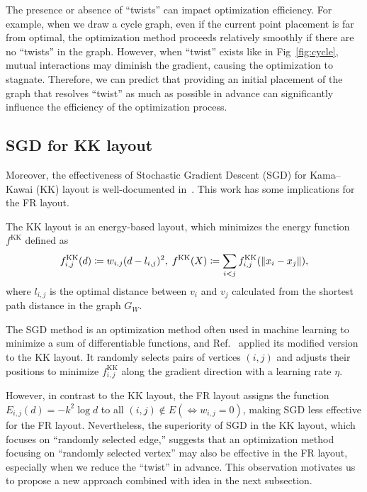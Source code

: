 \documentclass[dvipdfmx,10pt,journal,compsoc]{IEEEtran}
\newcommand{\defeq}{\coloneqq}
\begin{document}
The presence or absence of ``twists'' can impact optimization efficiency.
For example, when we draw a cycle graph, even if the current point placement is far from optimal, the optimization method proceeds relatively smoothly if there are no ``twists'' in the graph.
However, when ``twist'' exists like in Fig~\ref{fig:cycle}, mutual interactions may diminish the gradient, causing the optimization to stagnate.
Therefore, we can predict that providing an initial placement of the graph that resolves ``twist'' as much as possible in advance can significantly influence the efficiency of the optimization process.

\subsection{SGD for KK layout}\label{ssec:sgd}

Moreover, the effectiveness of Stochastic Gradient Descent (SGD) for Kama--Kawai (KK) layout is well-documented in~\cite{8419285}. This work has some implications for the FR layout.

The KK layout is an energy-based layout, which minimizes the energy function $f^{\mathrm{KK}}$ defined as
\begin{equation*}
    f^{\mathrm{KK}}_{i,j}(d) \defeq w_{i,j} (d-l_{i,j})^2, \;
    f^{\mathrm{KK}}(X) \defeq \sum_{i<j} f^{\mathrm{KK}}_{i,j}(\norm{x_i - x_j}),
\end{equation*}
where $l_{i,j}$ is the optimal distance between $v_i$ and $v_j$ calculated from the shortest path distance in the graph $G_W$.

The SGD method is an optimization method often used in machine learning to minimize a sum of differentiable functions, and Ref.~\cite{8419285} applied its modified version to the KK layout.
It randomly selects pairs of vertices $(i,j)$ and adjusts their positions to minimize $f^{\mathrm{KK}}_{i,j}$ along the gradient direction with a learning rate $\eta$.

However, in contrast to the KK layout, the FR layout assigns the function $E_{i,j}(d)=-k^2\log{d}$ to all $(i,j) \notin E (\iff w_{i,j}=0)$, making SGD less effective for the FR layout.
Nevertheless, the superiority of SGD in the KK layout, which focuses on ``randomly selected edge,'' suggests that an optimization method focusing on ``randomly selected vertex'' may also be effective in the FR layout, especially when we reduce the ``twist'' in advance.
This observation motivates us to propose a new approach combined with idea in the next subsection.
\end{document}
